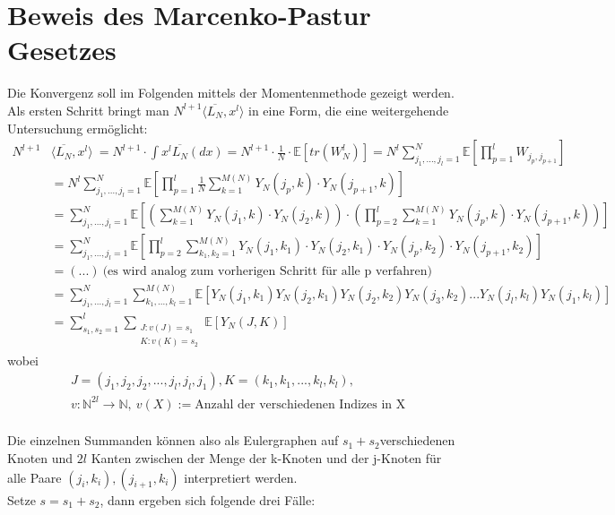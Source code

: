 \documentclass[a4paper, 11pt]{scrreprt}
\newcommand{\EE}{\mathbb{E}}
\newcommand{\NN}{\mathbb{N}}
\begin{document}
\section*{Beweis des Marcenko-Pastur Gesetzes}
Die Konvergenz soll im Folgenden mittels der Momentenmethode gezeigt werden. Als ersten Schritt bringt man \(N^{l+1} \langle \overline{L_N}, x^l \rangle\) in eine Form, die eine weitergehende Untersuchung ermöglicht:
\begin{equation}
\begin{split}
		N^{l+1} &\langle \overline{L_N}, x^l \rangle\ 
		= N^{l+1} \cdot \int x^l \overline{L_N}(dx) 
		= N^{l+1} \cdot \frac{1}{N} \cdot \EE[tr(W^l_N)] 
		= N^l \sum_{j_1,...,j_l = 1}^N \EE\left[\prod_{p = 1}^l W_{j_p,j_{p+1}}\right] \\
		&= N^l \sum_{j_1,...,j_l = 1}^N \EE\left[\prod_{p = 1}^l \frac{1}{N} \sum_{k = 1}^{M(N)} Y_N(j_p,k) \cdot Y_N(j_{p+1},k) \right] \\
		&= \sum_{j_1,...,j_l = 1}^N \EE \left[\left(\sum_{k = 1}^{M(N)} Y_N(j_1,k) \cdot Y_N(j_2,k)\right) \cdot \left(\prod_{p = 2}^l \sum_{k = 1}^{M(N)} Y_N(j_p,k) \cdot Y_N(j_{p+1},k) \right) \right] \\
		&= \sum_{j_1,...,j_l = 1}^N \EE\left[	\prod_{p = 2}^l \sum_{k_1,k_2 = 1}^{M(N)} Y_N(j_1,k_1) \cdot Y_N(j_2,k_1) \cdot Y_N(j_p,k_2) \cdot Y_N(j_{p+1},k_2) \right] \\
		&= (...)~ \text{(es wird analog zum vorherigen Schritt für alle p verfahren)}  \\
		&= \sum_{j_1,...,j_l = 1}^N \sum_{k_1,...,k_l = 1}^{M(N)} \EE[Y_N(j_1,k_1) Y_N(j_2,k_1) Y_N(j_2,k_2) Y_N(j_3,k_2) ... Y_N(j_l,k_l) Y_N(j_1,k_l)]\\
 &= \sum_{s_1,s_2 = 1}^l \sum_{\substack{J:v(J)=s_1\\ K:v(K)=s_2 }} \EE[Y_N(J,K)]
\end{split}
\end{equation}
wobei 
\begin{align*}
	&J=(j_1,j_2,j_2,...,j_l,j_l,j_1), K=(k_1,k_1,...,k_l,k_l),\\
	&v: \NN^{2l}\to \NN,\ v(X) := \text{Anzahl der verschiedenen Indizes in X}
\end{align*}
\\
Die einzelnen Summanden können also als Eulergraphen auf \(s_1+s_2 \)verschiedenen Knoten und \(2l\) Kanten zwischen der Menge der k-Knoten und der j-Knoten für alle Paare $ (j_i, k_i), (j_{i+1},k_i) $ interpretiert werden.\\
Setze \(s = s_1+s_2\), dann ergeben sich folgende drei Fälle:
\end{document}
